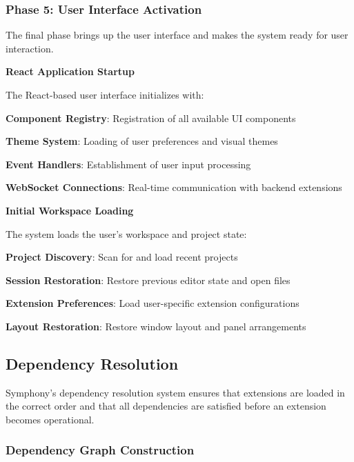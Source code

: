 \subsubsection{Phase 5: User Interface Activation}

The final phase brings up the user interface and makes the system ready for user interaction.

\textbf{React Application Startup}

The React-based user interface initializes with:

\begin{compactlist}
    \item \textbf{Component Registry}: Registration of all available UI components
    \item \textbf{Theme System}: Loading of user preferences and visual themes
    \item \textbf{Event Handlers}: Establishment of user input processing
    \item \textbf{WebSocket Connections}: Real-time communication with backend extensions
\end{compactlist}

\textbf{Initial Workspace Loading}

The system loads the user's workspace and project state:

\begin{compactlist}
    \item \textbf{Project Discovery}: Scan for and load recent projects
    \item \textbf{Session Restoration}: Restore previous editor state and open files
    \item \textbf{Extension Preferences}: Load user-specific extension configurations
    \item \textbf{Layout Restoration}: Restore window layout and panel arrangements
\end{compactlist}

\subsection{Dependency Resolution}
\label{subsec:dependency-resolution}

Symphony's dependency resolution system ensures that extensions are loaded in the correct order and that all dependencies are satisfied before an extension becomes operational.

\subsubsection{Dependency Graph Construction}

